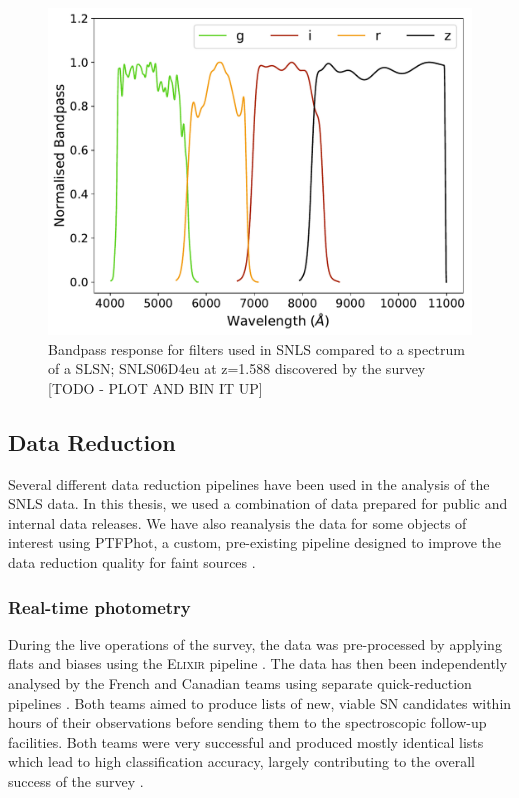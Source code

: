 \begin{figure}
  \centering
  \includegraphics[scale=0.8]{Figures/Chapter2/SNLS_filters.pdf}
    \caption{Bandpass response for filters used in SNLS compared to a spectrum of a SLSN; SNLS06D4eu at z=1.588 discovered by the survey [TODO - PLOT AND BIN IT UP]}
    \label{fig:SNLSFilters}
\end{figure}

\subsection{Data Reduction}
Several different data reduction pipelines have been used in the analysis of the SNLS data. In this thesis, we used a combination of data prepared for public and internal data releases. We have also reanalysis the data for some objects of interest using PTFPhot, a custom, pre-existing pipeline designed to improve the data reduction quality for faint sources \citep{Firth2015}.
% 
% 

\subsubsection{Real-time photometry}
During the live operations of the survey, the data was pre-processed by applying flats and biases using the \textsc{Elixir} pipeline \citep{Magnier2004}. The data has then been independently analysed by the French and Canadian teams using separate quick-reduction pipelines \citep{Astier2006,Bazin2011}. Both teams aimed to produce lists of new, viable SN candidates within hours of their observations before sending them to the spectroscopic follow-up facilities. Both teams were very successful and produced mostly identical lists which lead to high classification accuracy, largely contributing to the overall success of the survey \citep{Pritchet2004}.

